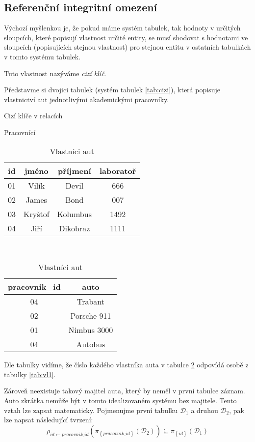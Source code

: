 \subsection{Referenční integritní omezení}
Výchozí myšlenkou je, že pokud máme systém tabulek, tak hodnoty v určitých sloupcích, které popisují vlastnost určité entity, se musí shodovat s hodnotami ve sloupcích (popisujících stejnou vlastnost) pro stejnou entitu v ostatních tabulkách v tomto systému tabulek.

Tuto vlastnost nazýváme \textit{cizí klíč}.

\begin{upexample}\label{ex:cizi}
Představme si dvojici tabulek (systém tabulek \ref{tab:cizi}), která popisuje vlastnictví aut jednotlivými akademickými pracovníky.
\begin{table}
\caption{Cizí klíče v relacích}\label{tab:cizi}
\begin{subtable}[t]{0.5\textwidth}
\centering
\caption{Pracovnící}\label{tab:vl1}
\begin{tabular}{c || c c c}
id & jméno & příjmení & laboratoř \\
\hline
\cellcolor{red}01 & Vilík & Devil & 666 \\
\cellcolor{yellow}02 & James & Bond & 007 \\
03 & Kryštof & Kolumbus & 1492 \\
\cellcolor{green}04 & Jiří & Dikobraz & 1111
\end{tabular}
\end{subtable}
~
\begin{subtable}[t]{0.45\textwidth}
\centering
\caption{Vlastníci aut}\label{tab:vl2}
\begin{tabular}{c || c}
pracovnik\_id & auto \\
\hline
\cellcolor{green}04 & Trabant \\
\cellcolor{yellow}02 & Porsche 911 \\
\cellcolor{red}01 & Nimbus 3000 \\
\cellcolor{green}04 & Autobus
\end{tabular}
\end{subtable}
\end{table}
Dle tabulky vidíme, že číslo každého vlastníka auta v tabulce \ref{tab:vl2} odpovídá osobě z tabulky \ref{tab:vl1}.

Zároveň neexistuje takový majitel auta, který by neměl v první tabulce záznam. Auto zkrátka nemůže být v tomto idealizovaném systému bez majitele. Tento vztah lze zapsat matematicky. Pojmenujme první tabulku $\mathcal{D}_{1}$ a druhou $\mathcal{D}_{2}$, pak lze napsat následující tvrzení:
$$
\rho_{id \leftarrow pracovnik\_id}(\pi_{\left\{ pracovnik\_id \right\}} \left( \mathcal{D}_{2} \right) ) \subseteq \pi_{\left\{ id \right\}} \left( \mathcal{D}_{1} \right)
$$
\end{upexample}

